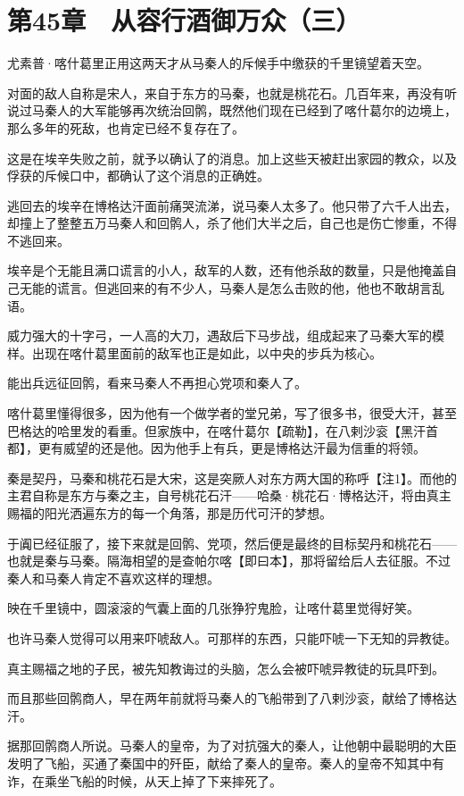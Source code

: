 \section{第45章　从容行酒御万众（三）}

尤素普·喀什葛里正用这两天才从马秦人的斥候手中缴获的千里镜望着天空。

对面的敌人自称是宋人，来自于东方的马秦，也就是桃花石。几百年来，再没有听说过马秦人的大军能够再次统治回鹘，既然他们现在已经到了喀什葛尔的边境上，那么多年的死敌，也肯定已经不复存在了。

这是在埃辛失败之前，就予以确认了的消息。加上这些天被赶出家园的教众，以及俘获的斥候口中，都确认了这个消息的正确姓。

逃回去的埃辛在博格达汗面前痛哭流涕，说马秦人太多了。他只带了六千人出去，却撞上了整整五万马秦人和回鹘人，杀了他们大半之后，自己也是伤亡惨重，不得不逃回来。

埃辛是个无能且满口谎言的小人，敌军的人数，还有他杀敌的数量，只是他掩盖自己无能的谎言。但逃回来的有不少人，马秦人是怎么击败的他，他也不敢胡言乱语。

威力强大的十字弓，一人高的大刀，遇敌后下马步战，组成起来了马秦大军的模样。出现在喀什葛里面前的敌军也正是如此，以中央的步兵为核心。

能出兵远征回鹘，看来马秦人不再担心党项和秦人了。

喀什葛里懂得很多，因为他有一个做学者的堂兄弟，写了很多书，很受大汗，甚至巴格达的哈里发的看重。但家族中，在喀什葛尔【疏勒】，在八剌沙衮【黑汗首都】，更有威望的还是他。因为他手上有兵，更是博格达汗最为信重的将领。

秦是契丹，马秦和桃花石是大宋，这是突厥人对东方两大国的称呼【注1】。而他的主君自称是东方与秦之主，自号桃花石汗——哈桑·桃花石·博格达汗，将由真主赐福的阳光洒遍东方的每一个角落，那是历代可汗的梦想。

于阗已经征服了，接下来就是回鹘、党项，然后便是最终的目标契丹和桃花石——也就是秦与马秦。隔海相望的是查帕尔喀【即曰本】，那将留给后人去征服。不过秦人和马秦人肯定不喜欢这样的理想。

映在千里镜中，圆滚滚的气囊上面的几张狰狞鬼脸，让喀什葛里觉得好笑。

也许马秦人觉得可以用来吓唬敌人。可那样的东西，只能吓唬一下无知的异教徒。

真主赐福之地的子民，被先知教诲过的头脑，怎么会被吓唬异教徒的玩具吓到。

而且那些回鹘商人，早在两年前就将马秦人的飞船带到了八剌沙衮，献给了博格达汗。

据那回鹘商人所说。马秦人的皇帝，为了对抗强大的秦人，让他朝中最聪明的大臣发明了飞船，买通了秦国中的歼臣，献给了秦人的皇帝。秦人的皇帝不知其中有诈，在乘坐飞船的时候，从天上掉了下来摔死了。

